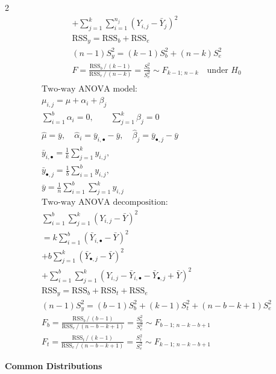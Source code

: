 \documentclass[10pt]{extarticle}
\theoremstyle{definition}
\theoremstyle{remark}
\begin{document}
\begin{multicols}{2}
\begin{gather*}
        + \sum_{j=1}^k \sum_{i=1}^{n_j}(Y_{i,j} - \bar{Y}_j)^2 \\
        \text{RSS}_y = \text{RSS}_b + \text{RSS}_e \\
        (n-1)S_y^2 = (k-1)S_b^2 + (n-k)S_e^2 \\
        F = \frac{\text{RSS}_b\,/\,(k-1)}{\text{RSS}_e\,/\,(n-k)} = \frac{S_b^2}{S_e^2} \sim F_{k-1;\,n-k} \quad \text{under } H_0 \\
    \end{gather*}
    \begin{gather*}
        \text{Two-way ANOVA model:} \\
        \mu_{i,j} = \mu + \alpha_i + \beta_j \\
        \sum_{i=1}^b \alpha_i = 0, \qquad \sum_{j=1}^k \beta_j = 0 \\
        \hat{\mu} = \bar{y}, \quad \hat{\alpha}_i = \bar{y}_{i,\bullet} - \bar{y}, \quad \hat{\beta}_j = \bar{y}_{\bullet,j} - \bar{y} \\
        \bar{y}_{i,\bullet} = \frac{1}{k}\sum_{j=1}^k y_{i,j}, \qquad \\
        \bar{y}_{\bullet,j} = \frac{1}{b}\sum_{i=1}^b y_{i,j}, \qquad \\
        \bar{y} = \frac{1}{n}\sum_{i=1}^b\sum_{j=1}^k y_{i,j} \\
        \text{Two-way ANOVA decomposition:} \\
        \sum_{i=1}^b\sum_{j=1}^k (Y_{i,j} - \bar{Y})^2 \\
        = k\sum_{i=1}^b(\bar{Y}_{i,\bullet} - \bar{Y})^2 \\
        + b\sum_{j=1}^k(\bar{Y}_{\bullet,j} - \bar{Y})^2 \\
        + \sum_{i=1}^b\sum_{j=1}^k (Y_{i,j} - \bar{Y}_{i,\bullet} - \bar{Y}_{\bullet,j} + \bar{Y})^2 \\
        \text{RSS}_y = \text{RSS}_b + \text{RSS}_t + \text{RSS}_e \\
        (n-1)S_y^2 = (b-1)S_b^2 + (k-1)S_t^2 + (n-b-k+1)S_e^2 \\
        F_b = \frac{\text{RSS}_b\,/\,(b-1)}{\text{RSS}_e\,/\,(n-b-k+1)} = \frac{S_b^2}{S_e^2} \sim F_{b-1;\,n-k-b+1} \\
        F_t = \frac{\text{RSS}_t\,/\,(k-1)}{\text{RSS}_e\,/\,(n-b-k+1)} = \frac{S_t^2}{S_e^2} \sim F_{k-1;\,n-k-b+1}
    \end{gather*}


    \noindent
    {\large\textbf{Common Distributions}}


\end{multicols}
\end{document}
